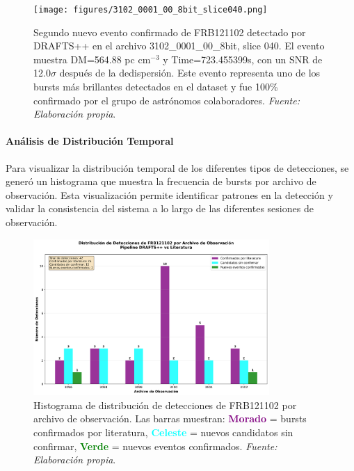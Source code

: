 \begin{figure}[H]
    \centering
    \texttt{[image: figures/3102\_0001\_00\_8bit\_slice040.png]}
    \caption{Segundo nuevo evento confirmado de FRB121102 detectado por DRAFTS++ en el archivo 3102\_0001\_00\_8bit, slice 040. El evento muestra DM=564.88 pc cm$^{-3}$ y Time=723.455399s, con un SNR de 12.0$\sigma$ después de la dedispersión. Este evento representa uno de los bursts más brillantes detectados en el dataset y fue 100\% confirmado por el grupo de astrónomos colaboradores. \textit{Fuente: Elaboración propia}.}
    \label{fig:new_event_3102}
\end{figure}

\paragraph{Análisis de Distribución Temporal}

Para visualizar la distribución temporal de los diferentes tipos de detecciones, se generó un histograma que muestra la frecuencia de bursts por archivo de observación. Esta visualización permite identificar patrones en la detección y validar la consistencia del sistema a lo largo de las diferentes sesiones de observación.

\begin{figure}[H]
    \centering
    \includegraphics[width=0.8\textwidth]{figures/frb121102_detection_histogram.png}
    \caption{Histograma de distribución de detecciones de FRB121102 por archivo de observación. Las barras muestran: \textcolor{purple}{\textbf{Morado}} = bursts confirmados por literatura, \textcolor{cyan}{\textbf{Celeste}} = nuevos candidatos sin confirmar, \textcolor{green}{\textbf{Verde}} = nuevos eventos confirmados. \textit{Fuente: Elaboración propia}.}
    \label{fig:frb121102_histogram}
\end{figure}


